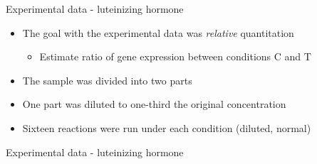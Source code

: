 \documentclass{beamer}
\begin{document}
\begin{frame}{Experimental data - luteinizing hormone} 
\begin{itemize}
  \item The goal with the experimental data was \emph{relative} quantitation
  \begin{itemize}
    \item Estimate ratio of gene expression between conditions C and T
  \end{itemize}
  \item The sample was divided into two parts
  \item One part was diluted to one-third the original concentration
  \item Sixteen reactions were run under each condition (diluted, normal)
\end{itemize}
\end{frame} 


\begin{frame}{Experimental data - luteinizing hormone} 

\end{frame} 
\end{document}
